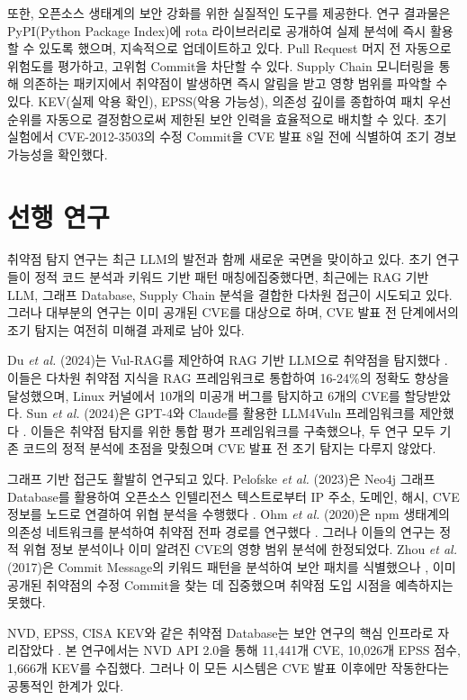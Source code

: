 ﻿\documentclass[conference]{IEEEtran}
\begin{document}
또한, 오픈소스 생태계의 보안 강화를 위한 실질적인 도구를 제공한다. 연구 결과물은 PyPI(Python Package Index)에 rota 라이브러리로 공개하여 실제 분석에 즉시 활용할 수 있도록 했으며, 지속적으로 업데이트하고 있다. Pull Request 머지 전 자동으로 위험도를 평가하고, 고위험 Commit을 차단할 수 있다. Supply Chain 모니터링을 통해 의존하는 패키지에서 취약점이 발생하면 즉시 알림을 받고 영향 범위를 파악할 수 있다. KEV(실제 악용 확인), EPSS(악용 가능성), 의존성 깊이를 종합하여 패치 우선순위를 자동으로 결정함으로써 제한된 보안 인력을 효율적으로 배치할 수 있다. 초기 실험에서 CVE-2012-3503의 수정 Commit을 CVE 발표 8일 전에 식별하여 조기 경보 가능성을 확인했다.


\section{선행 연구}

취약점 탐지 연구는 최근 LLM의 발전과 함께 새로운 국면을 맞이하고 있다. 초기 연구들이 정적 코드 분석과 키워드 기반 패턴 매칭에집중했다면, 최근에는 RAG 기반 LLM, 그래프 Database, Supply Chain 분석을 결합한 다차원 접근이 시도되고 있다. 그러나 대부분의 연구는 이미 공개된 CVE를 대상으로 하며, CVE 발표 전 단계에서의 조기 탐지는 여전히 미해결 과제로 남아 있다.

Du \textit{et al.} (2024)는 Vul-RAG를 제안하여 RAG 기반 LLM으로 취약점을 탐지했다 \cite{vulrag2024}. 이들은 다차원 취약점 지식을 RAG 프레임워크로 통합하여 16-24\%의 정확도 향상을 달성했으며, Linux 커널에서 10개의 미공개 버그를 탐지하고 6개의 CVE를 할당받았다. Sun \textit{et al.} (2024)은 GPT-4와 Claude를 활용한 LLM4Vuln 프레임워크를 제안했다 \cite{sun2024}. 이들은 취약점 탐지를 위한 통합 평가 프레임워크를 구축했으나, 두 연구 모두 기존 코드의 정적 분석에 초점을 맞췄으며 CVE 발표 전 조기 탐지는 다루지 않았다.

그래프 기반 접근도 활발히 연구되고 있다. Pelofske \textit{et al.} (2023)은 Neo4j 그래프 Database를 활용하여 오픈소스 인텔리전스 텍스트로부터 IP 주소, 도메인, 해시, CVE 정보를 노드로 연결하여 위협 분석을 수행했다 \cite{pelofske2023}. Ohm \textit{et al.} (2020)은 npm 생태계의 의존성 네트워크를 분석하여 취약점 전파 경로를 연구했다 \cite{ohm2020}. 그러나 이들의 연구는 정적 위협 정보 분석이나 이미 알려진 CVE의 영향 범위 분석에 한정되었다. Zhou \textit{et al.} (2017)은 Commit Message의 키워드 패턴을 분석하여 보안 패치를 식별했으나 \cite{zhou2017}, 이미 공개된 취약점의 수정 Commit을 찾는 데 집중했으며 취약점 도입 시점을 예측하지는 못했다.

NVD, EPSS, CISA KEV와 같은 취약점 Database는 보안 연구의 핵심 인프라로 자리잡았다 \cite{nvd2025, epss2025, cisa2025}. 본 연구에서는 NVD API 2.0을 통해 11,441개 CVE, 10,026개 EPSS 점수, 1,666개 KEV를 수집했다. 그러나 이 모든 시스템은 CVE 발표 이후에만 작동한다는 공통적인 한계가 있다.
\end{document}
